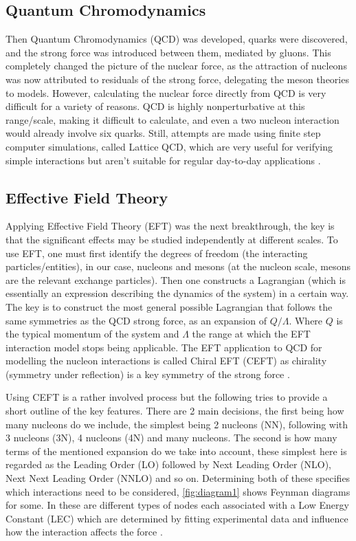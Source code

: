 \subsection{Quantum Chromodynamics}
Then Quantum Chromodynamics (QCD) was developed, quarks were discovered, and the strong force was introduced between them, mediated by gluons.
This completely changed the picture of the nuclear force, as the attraction of nucleons was now attributed to residuals of the strong force, delegating the meson theories to models.
However, calculating the nuclear force directly from QCD is very difficult for a variety of reasons. QCD is highly nonperturbative at this range/scale, making it difficult to calculate, and even a two nucleon interaction would already involve six quarks.
Still, attempts are made using finite step computer simulations, called Lattice QCD, which are very useful for verifying simple interactions but aren't suitable for regular day-to-day applications \cite{machleidt_nuclear_2013,hergert_guided_2020}.

\subsection{Effective Field Theory}
Applying Effective Field Theory (EFT) was the next breakthrough, the key is that the significant effects may be studied independently at different scales.
To use EFT, one must first identify the degrees of freedom (the interacting particles/entities), in our case, nucleons and mesons (at the nucleon scale, mesons are the relevant exchange particles).
Then one constructs a Lagrangian (which is essentially an expression describing the dynamics of the system) in a certain way.
The key is to construct the most general possible Lagrangian that follows the same symmetries as the QCD strong force, as an expansion of $Q/\Lambda$.
Where $Q$ is the typical momentum of the system and $\Lambda$ the range at which the EFT interaction model stops being applicable.
The EFT application to QCD for modelling the nucleon interactions is called Chiral EFT (CEFT) as chirality (symmetry under reflection) is a key symmetry of the strong force \cite{machleidt_chiral_2011, machleidt_nuclear_2013, burgess_introduction_2007, hergert_guided_2020}.

Using CEFT is a rather involved process but the following tries to provide a short outline of the key features.
There are 2 main decisions, the first being how many nucleons do we include, the simplest being 2 nucleons (NN), following with 3 nucleons (3N), 4 nucleons (4N) and many nucleons.
The second is how many terms of the mentioned expansion do we take into account, these simplest here is regarded as the Leading Order (LO) followed by Next Leading Order (NLO), Next Next Leading Order (NNLO) and so on.
Determining both of these specifies which interactions need to be considered, \cref{fig:diagram1} shows Feynman diagrams for some.
In these are different types of nodes each associated with a Low Energy Constant (LEC) which are determined by fitting experimental data and influence how the interaction affects the force \cite{machleidt_chiral_2011, machleidt_nuclear_2013, burgess_introduction_2007, hergert_guided_2020}.

